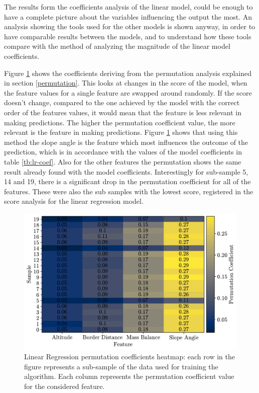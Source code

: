 The results form the coefficients analysis of the linear model, could be enough to have a complete picture about the variables influencing the output the most. An analysis showing the tools used for the other models is shown anyway, in order to have comparable results between the models, and to understand how these tools compare with the method of analyzing the magnitude of the linear model coefficients. 

Figure \ref{fig:lr-heatmap} shows the coefficients deriving from the permutation analysis explained in section \ref{permutation}. This looks at changes in the score of the model, when the feature values for a single feature are swapped around randomly. If the score doesn't change, compared to the one achieved by the model with the correct order of the features values, it would mean that the feature is less relevant in making predictions. The higher the permutation coefficient value, the more relevant is the feature in making predictions. Figure \ref{fig:lr-heatmap} shows that using this method the slope angle is the feature which most influences the outcome of the prediction, which is in accordance with the values of the model coefficients in table \ref{tb:lr-coef}. Also for the other features the permutation shows the same result already found with the model coefficients. Interestingly for sub-sample 5, 14 and 19, there is a significant drop in the permutation coefficient for all of the features. These were also the sub samples with the lowest score, registered in the score analysis for the linear regression model.

\begin{figure}[!tp]
	\centering		  
	\includegraphics[width=1.\textwidth]{figures/LR_heatmap.pdf}
	\caption{Linear Regression permutation coefficients heatmap: each row in the figure represents a sub-sample of the data used for training the algorithm. Each column represents the permutation coefficient value for the considered feature.}
	\label{fig:lr-heatmap}
\end{figure}

